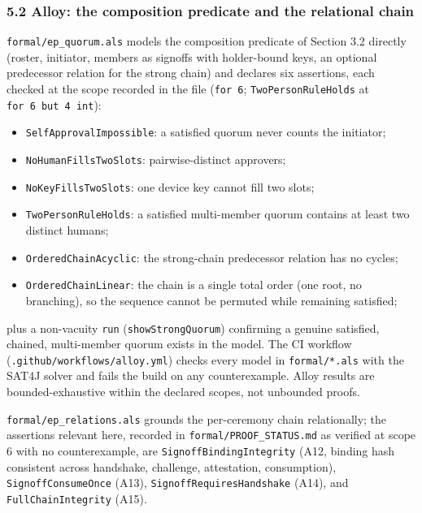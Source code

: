 \documentclass[
  11pt,
]{article}
\providecommand{\tightlist}{%
  \setlength{\itemsep}{0pt}\setlength{\parskip}{0pt}}
\begin{document}
\subsubsection{5.2 Alloy: the composition predicate and the relational
chain}\label{alloy}

\texttt{formal/ep\_quorum.als} models the composition predicate of
Section 3.2 directly (roster, initiator, members as signoffs with
holder-bound keys, an optional predecessor relation for the strong
chain) and declares six assertions, each checked at the scope recorded
in the file (\texttt{for\ 6}; \texttt{TwoPersonRuleHolds} at
\texttt{for\ 6\ but\ 4\ int}):

\begin{itemize}
\tightlist
\item
  \texttt{SelfApprovalImpossible}: a satisfied quorum never counts the
  initiator;
\item
  \texttt{NoHumanFillsTwoSlots}: pairwise-distinct approvers;
\item
  \texttt{NoKeyFillsTwoSlots}: one device key cannot fill two slots;
\item
  \texttt{TwoPersonRuleHolds}: a satisfied multi-member quorum contains
  at least two distinct humans;
\item
  \texttt{OrderedChainAcyclic}: the strong-chain predecessor relation
  has no cycles;
\item
  \texttt{OrderedChainLinear}: the chain is a single total order (one
  root, no branching), so the sequence cannot be permuted while
  remaining satisfied;
\end{itemize}

plus a non-vacuity \texttt{run} (\texttt{showStrongQuorum}) confirming a
genuine satisfied, chained, multi-member quorum exists in the model. The
CI workflow (\texttt{.github/workflows/alloy.yml}) checks every model in
\texttt{formal/*.als} with the SAT4J solver and fails the build on any
counterexample. Alloy results are bounded-exhaustive within the declared
scopes, not unbounded proofs.

\texttt{formal/ep\_relations.als} grounds the per-ceremony chain
relationally; the assertions relevant here, recorded in
\texttt{formal/PROOF\_STATUS.md} as verified at scope 6 with no
counterexample, are \texttt{SignoffBindingIntegrity} (A12, binding hash
consistent across handshake, challenge, attestation, consumption),
\texttt{SignoffConsumeOnce} (A13), \texttt{SignoffRequiresHandshake}
(A14), and \texttt{FullChainIntegrity} (A15).
\end{document}
